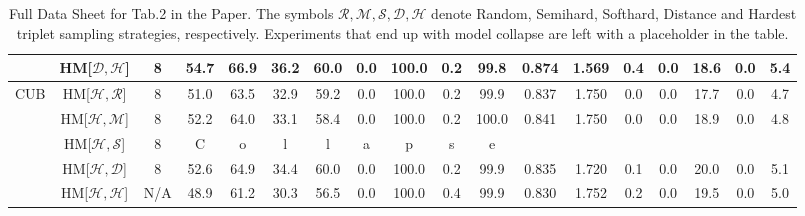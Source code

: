 \begin{table*}
{\begin{tabular}{c|cc|cccc|ccccc|ccccc|c}
 & HM{[}$\mathcal{D},\mathcal{H}${]} & 8 & 54.7 & 66.9 & 36.2 & 60.0 & 0.0 & 100.0 & 0.2 & 99.8 & 0.874 & 1.569 & 0.4 & 0.0 & 18.6 & 0.0 & 5.4\tabularnewline
\hline 
\multirow{5}{*}{CUB} & HM{[}$\mathcal{H},\mathcal{R}${]} & 8 & 51.0 & 63.5 & 32.9 & 59.2 & 0.0 & 100.0 & 0.2 & 99.9 & 0.837 & 1.750 & 0.0 & 0.0 & 17.7 & 0.0 & 4.7\tabularnewline
 & HM{[}$\mathcal{H},\mathcal{M}${]} & 8 & 52.2 & 64.0 & 33.1 & 58.4 & 0.0 & 100.0 & 0.2 & 100.0 & 0.841 & 1.750 & 0.0 & 0.0 & 18.9 & 0.0 & 4.8\tabularnewline
 & HM{[}$\mathcal{H},\mathcal{S}${]} & 8 & C & o & l & l & a & p & s & e &  &  &  &  &  &  & \tabularnewline
 & HM{[}$\mathcal{H},\mathcal{D}${]} & 8 & 52.6 & 64.9 & 34.4 & 60.0 & 0.0 & 100.0 & 0.2 & 99.9 & 0.835 & 1.720 & 0.1 & 0.0 & 20.0 & 0.0 & 5.1\tabularnewline
 & HM{[}$\mathcal{H},\mathcal{H}${]} & N/A & 48.9 & 61.2 & 30.3 & 56.5 & 0.0 & 100.0 & 0.4 & 99.9 & 0.830 & 1.752 & 0.2 & 0.0 & 19.5 & 0.0 & 5.0\tabularnewline

	\bottomrule

\end{tabular}}

	\caption{Full Data Sheet for Tab.2 in the Paper. The symbols $\mathcal{R},
	\mathcal{M}, \mathcal{S}, \mathcal{D}, \mathcal{H}$ denote Random, Semihard,
	Softhard, Distance and Hardest triplet sampling strategies, respectively.
	Experiments that end up with model collapse are left with a placeholder 
	in the table.
	}
\label{tab:srcdest}
\end{table*}

